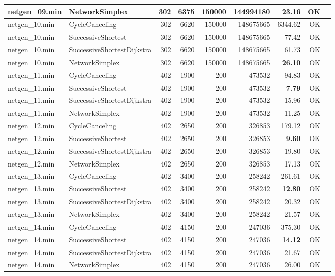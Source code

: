 \begin{longtable}{llrrrrrrl}
netgen\_09.min & NetworkSimplex & 302 & 6375 & 150000 & 144994180 & \textbf{23.16} & OK \\
\midrule
netgen\_10.min & CycleCanceling & 302 & 6620 & 150000 & 148675665 & 6344.62 & OK \\
netgen\_10.min & SuccessiveShortest & 302 & 6620 & 150000 & 148675665 & 77.42 & OK \\
netgen\_10.min & SuccessiveShortestDijkstra & 302 & 6620 & 150000 & 148675665 & 61.73 & OK \\
netgen\_10.min & NetworkSimplex & 302 & 6620 & 150000 & 148675665 & \textbf{26.10} & OK \\
\midrule
netgen\_11.min & CycleCanceling & 402 & 1900 & 200 & 473532 & 94.83 & OK \\
netgen\_11.min & SuccessiveShortest & 402 & 1900 & 200 & 473532 & \textbf{7.79} & OK \\
netgen\_11.min & SuccessiveShortestDijkstra & 402 & 1900 & 200 & 473532 & 15.96 & OK \\
netgen\_11.min & NetworkSimplex & 402 & 1900 & 200 & 473532 & 11.25 & OK \\
\midrule
netgen\_12.min & CycleCanceling & 402 & 2650 & 200 & 326853 & 179.12 & OK \\
netgen\_12.min & SuccessiveShortest & 402 & 2650 & 200 & 326853 & \textbf{9.60} & OK \\
netgen\_12.min & SuccessiveShortestDijkstra & 402 & 2650 & 200 & 326853 & 19.80 & OK \\
netgen\_12.min & NetworkSimplex & 402 & 2650 & 200 & 326853 & 17.13 & OK \\
\midrule
netgen\_13.min & CycleCanceling & 402 & 3400 & 200 & 258242 & 261.61 & OK \\
netgen\_13.min & SuccessiveShortest & 402 & 3400 & 200 & 258242 & \textbf{12.80} & OK \\
netgen\_13.min & SuccessiveShortestDijkstra & 402 & 3400 & 200 & 258242 & 20.32 & OK \\
netgen\_13.min & NetworkSimplex & 402 & 3400 & 200 & 258242 & 21.57 & OK \\
\midrule
netgen\_14.min & CycleCanceling & 402 & 4150 & 200 & 247036 & 375.30 & OK \\
netgen\_14.min & SuccessiveShortest & 402 & 4150 & 200 & 247036 & \textbf{14.12} & OK \\
netgen\_14.min & SuccessiveShortestDijkstra & 402 & 4150 & 200 & 247036 & 21.67 & OK \\
netgen\_14.min & NetworkSimplex & 402 & 4150 & 200 & 247036 & 26.00 & OK \\

\end{longtable}
